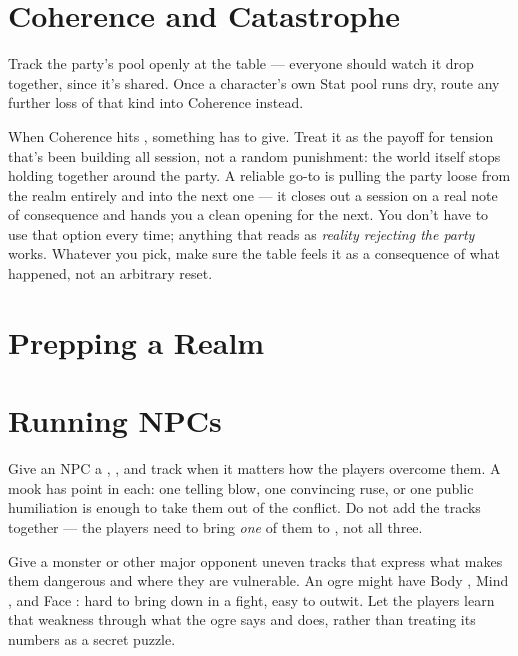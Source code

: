 \section{Coherence and Catastrophe}
Track the party's  pool openly at the table ---
everyone should watch it drop together, since it's shared. Once a
character's own Stat pool runs dry, route any further loss of that kind
into Coherence instead.

When Coherence hits , something has to give. Treat it as the
payoff for tension that's been building all session, not a random
punishment: the world itself stops holding together around the party.
A reliable go-to is pulling the party loose from the realm entirely and
into the next one --- it closes out a session on a real note of
consequence and hands you a clean opening for the next. You don't have
to use that option every time; anything that reads as \emph{reality
rejecting the party} works. Whatever you pick, make sure the table feels
it as a consequence of what happened, not an arbitrary reset.

\section{Prepping a Realm}
\lipsum[53][1-4]

\section{Running NPCs}
Give an NPC a , , and  track
when it matters how the players overcome them. A mook has 
point in each: one telling blow, one convincing ruse, or one public
humiliation is enough to take them out of the conflict. Do not add the
tracks together --- the players need to bring \emph{one} of them to
, not all three.

Give a monster or other major opponent uneven tracks that express what
makes them dangerous and where they are vulnerable. An ogre might have
Body , Mind , and Face : hard to bring down in
a fight, easy to outwit. Let the players learn that weakness through
what the ogre says and does, rather than treating its numbers as a
secret puzzle.

